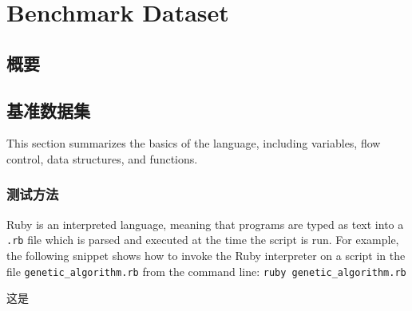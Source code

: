 
\chapter{Benchmark Dataset}
\label{ch:appendix1}

\section{概要}


\section{基准数据集}
This section summarizes the basics of the language, including variables, flow control, data structures, and functions.

\subsection{测试方法}
Ruby is an interpreted language, meaning that programs are typed as text into a \texttt{.rb} file which is parsed and executed at the time the script is run. For example, the following snippet shows how to invoke the Ruby interpreter on a script in the file \texttt{genetic\_algorithm.rb} from the command line: \texttt{ruby genetic\_algorithm.rb}

\newpage

这是